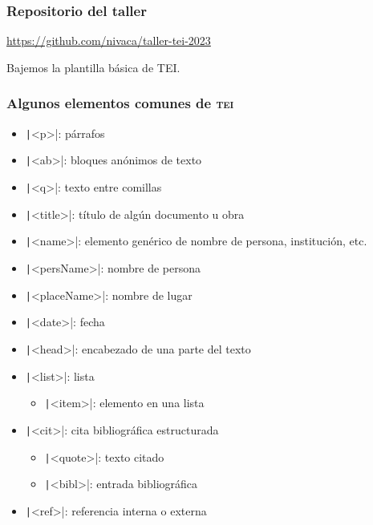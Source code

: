 \documentclass[%
  handout, %
  xcolor=svgnames]{beamer}
\newcommand*{\TEI}{\textsc{tei}}
\begin{document}


\begin{frame}
  \frametitle{Repositorio del taller}

  \centering

  \url{https://github.com/nivaca/taller-tei-2023}

  \bigskip

  Bajemos la plantilla básica de TEI.

  
\end{frame}


\begin{frame}
  \frametitle{Algunos elementos comunes de \TEI}
  \begin{itemize}
    \item \texttt|<p>|: párrafos
    \item \texttt|<ab>|: bloques anónimos de texto
    \item \texttt|<q>|: texto entre comillas
    \item \texttt|<title>|: título de algún documento u obra
    \item \texttt|<name>|: elemento genérico de nombre de persona, institución, etc.
    \item \texttt|<persName>|: nombre de persona
    \item \texttt|<placeName>|: nombre de lugar
    \item \texttt|<date>|: fecha
    \item \texttt|<head>|: encabezado de una parte del texto
    \item \texttt|<list>|: lista
      \begin{itemize}
        \item \texttt|<item>|: elemento en una lista
      \end{itemize}
    \item \texttt|<cit>|: cita bibliográfica estructurada
      \begin{itemize}
        \item \texttt|<quote>|: texto citado
        \item \texttt|<bibl>|: entrada bibliográfica
      \end{itemize}
    \item \texttt|<ref>|: referencia interna o externa
  \end{itemize}
\end{frame}
\end{document}
